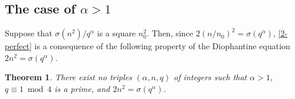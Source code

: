 \documentclass[11pt]{amsart}
\theoremstyle{plain}
\newtheorem{theorem}{Theorem}[section]
\theoremstyle{definition}
\begin{document}
\subsection{The case of $\alpha > 1$}

Suppose that $\sigma(n^{2})/q^{\alpha}$ is a square $n_{0}^{2}$.
Then, since $2(n/n_{0})^{2} = \sigma(q^{\alpha})$,
\cref{2-perfect} is a consequence of the following property
of the Diophantine equation $2n^{2} = \sigma(q^{\alpha})$.


\begin{theorem} \label{main}
There exist no triples $(\alpha, n, q)$ of integers such that
$\alpha > 1$, $q \equiv 1 \bmod 4$ is a prime, and $2n^{2} = \sigma(q^{\alpha})$.
\end{theorem}
\end{document}
